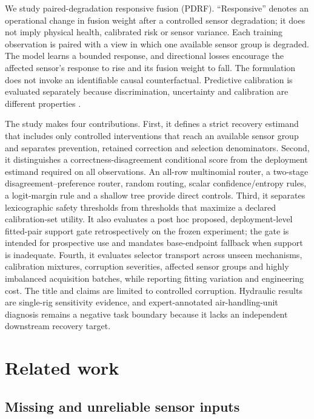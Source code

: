 \documentclass[11pt]{article}
\begin{document}
We study paired-degradation responsive fusion (PDRF). ``Responsive'' denotes an operational change in fusion weight after a controlled sensor degradation; it does not imply physical health, calibrated risk or sensor variance. Each training observation is paired with a view in which one available sensor group is degraded. The model learns a bounded response, and directional losses encourage the affected sensor's response to rise and its fusion weight to fall. The formulation does not invoke an identifiable causal counterfactual. Predictive calibration is evaluated separately because discrimination, uncertainty and calibration are different properties \citep{kendall2017uncertainties,hullermeier2021uncertainty,lakshminarayanan2017ensembles,guo2017calibration,ovadia2019trust,minderer2021calibration,vaicenavicius2019calibration}.

The study makes four contributions. First, it defines a strict recovery estimand that includes only controlled interventions that reach an available sensor group and separates prevention, retained correction and selection denominators. Second, it distinguishes a correctness-disagreement conditional score from the deployment estimand required on all observations. An all-row multinomial router, a two-stage disagreement--preference router, random routing, scalar confidence/entropy rules, a logit-margin rule and a shallow tree provide direct controls. Third, it separates lexicographic safety thresholds from thresholds that maximize a declared calibration-set utility. It also evaluates a post hoc proposed, deployment-level fitted-pair support gate retrospectively on the frozen experiment; the gate is intended for prospective use and mandates base-endpoint fallback when support is inadequate. Fourth, it evaluates selector transport across unseen mechanisms, calibration mixtures, corruption severities, affected sensor groups and highly imbalanced acquisition batches, while reporting fitting variation and engineering cost. The title and claims are limited to controlled corruption. Hydraulic results are single-rig sensitivity evidence, and expert-annotated air-handling-unit diagnosis remains a negative task boundary because it lacks an independent downstream recovery target.

\section{Related work}

\subsection{Missing and unreliable sensor inputs}
\end{document}
